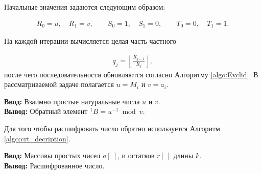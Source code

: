 \documentclass{crm-article}
\begin{document}
Начальные значения задаются следующим образом:

\begin{gather}
    R_0=u,\quad R_1=v,\qquad
    S_0=1,\quad S_1=0,\qquad
    T_0=0,\quad T_1=1.
\end{gather}

На каждой итерации вычисляется целая часть частного

\begin{gather}
    q_j=\left\lfloor\frac{R_{j-1}}{R_j}\right\rfloor,
\end{gather}
после чего последовательности обновляются согласно Алгоритму \ref{algo:Evclid}. В рассматриваемой задаче полагается $u=M_i$ и $v=a_i$.

\begin{algorithm}[H]
    \textbf{Ввод:} Взаимно простые натуральные числа $u$ и $v$.\\
    \textbf{Вывод:} Обратный элемент $^1B=u^{-1}\bmod v$.
    \begin{algorithmic}
        \ENDWHILE
    \end{algorithmic}
    \caption{Вычисление обратного элемента с использованием
    расширенного алгоритма Евклида.}
    \label{algo:Evclid}
\end{algorithm}

Для того чтобы расшифровать число обратно используется Алгоритм \ref{algo:crt_decription}.

\begin{algorithm}[H]
	\textbf{Ввод:} Массивы простых чисел $a[~]$, и остатков $r[~]$ длины $k$.\\
	\textbf{Вывод:} Расшифрованное число.
	\begin{algorithmic}
	\end{algorithmic}
	\caption{Восстановление числа из простых чисел и остатков от делений на них.}
	\label{algo:crt_decription}
\end{algorithm}
\end{document}
